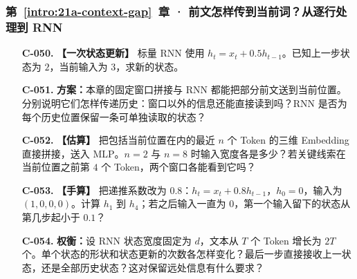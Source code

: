 \subsubsection*{第~\ref*{intro:21a-context-gap}~章 · 前文怎样传到当前词？从逐行处理到 RNN}
\begin{enumerate}[label={},leftmargin=4.8em,itemsep=4pt]
\item[\textbf{C-050.}] \leavevmode{}\label{exercise:C-050}\label{exercise:rnn-one-step}\textbf{【一次状态更新】} 标量 RNN 使用 $h_t=x_t+0.5h_{t-1}$。已知上一步状态为 $2$，当前输入为 $3$，求新的状态。
\item[\textbf{C-051.}] \leavevmode{}\label{exercise:C-051}\label{exercise:history-model-comparison}\textbf{方案：}本章的固定窗口拼接与 RNN 都能把部分前文送到当前位置。分别说明它们怎样传递历史：窗口以外的信息还能直接读到吗？RNN 是否为每个历史位置保留一条可单独读取的状态？
\item[\textbf{C-052.}] \leavevmode{}\label{exercise:C-052}\label{exercise:window-input-width}\textbf{【估算】} 把包括当前位置在内的最近 $n$ 个 Token 的三维 Embedding 直接拼接，送入 MLP。$n=2$ 与 $n=8$ 时输入宽度各是多少？若关键线索在当前位置之前第 $4$ 个 Token，两个窗口各能看到它吗？
\item[\textbf{C-053.}] \leavevmode{}\label{exercise:C-053}\label{exercise:rnn-decay}\textbf{【手算】} 把递推系数改为 $0.8$：$h_t=x_t+0.8h_{t-1}$，$h_0=0$，输入为 $(1,0,0,0)$。计算 $h_1$ 到 $h_4$；若之后输入一直为 $0$，第一个输入留下的状态从第几步起小于 $0.1$？
\item[\textbf{C-054.}] \leavevmode{}\label{exercise:C-054}\label{exercise:rnn-state-scaling}\textbf{权衡：}设 RNN 状态宽度固定为 $d$，文本从 $T$ 个 Token 增长为 $2T$ 个。单个状态的形状和状态更新的次数各怎样变化？最后一步直接接收上一状态，还是全部历史状态？这对保留远处信息有什么要求？
\end{enumerate}
